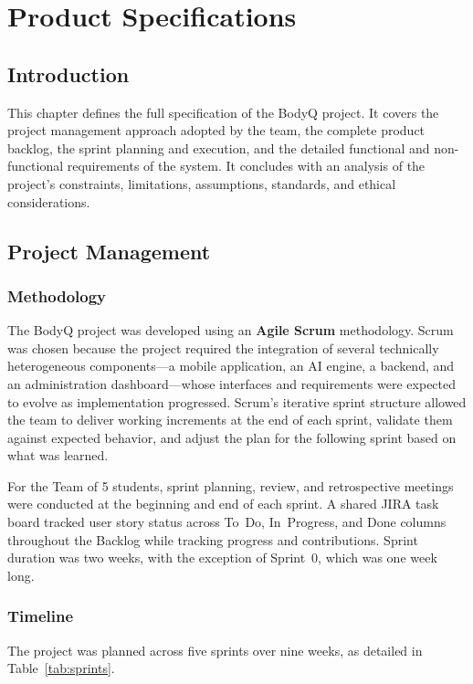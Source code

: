 
\chapter{Product Specifications}

\section{Introduction}
This chapter defines the full specification of the BodyQ project. It
covers the project management approach adopted by the team, the complete
product backlog, the sprint planning and execution, and the detailed
functional and non-functional requirements of the system. It concludes
with an analysis of the project's constraints, limitations, assumptions,
standards, and ethical considerations.

\section{Project Management}

\subsection{Methodology}
The BodyQ project was developed using an \textbf{Agile Scrum}
methodology. Scrum was chosen because the project required the integration
of several technically heterogeneous components---a mobile application,
an AI engine, a backend, and an administration dashboard---whose
interfaces and requirements were expected to evolve as implementation
progressed. Scrum's iterative sprint structure allowed the team to
deliver working increments at the end of each sprint, validate them
against expected behavior, and adjust the plan for the following sprint
based on what was learned.

For the Team of 5 students, sprint planning, review, and retrospective meetings were conducted at the beginning and end of each sprint. A
shared JIRA task board tracked user story status across To~Do,
In~Progress, and Done columns throughout the Backlog while tracking progress and contributions. Sprint duration was two weeks, with the
exception of Sprint~0, which was one week long.

\subsection{Timeline}
The project was planned across five sprints over nine weeks, as detailed
in Table~\ref{tab:sprints}.

